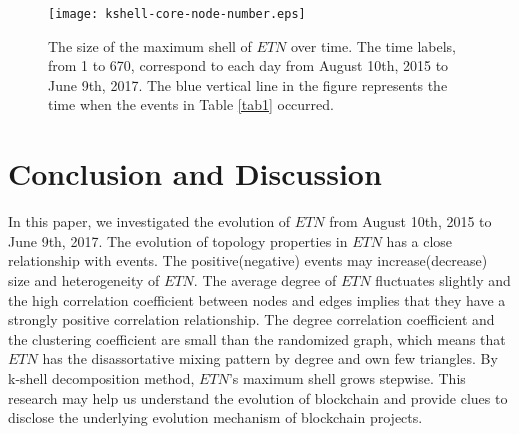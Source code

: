 \documentclass[conference]{IEEEtran}
\begin{document}
\begin{CJK*}{UTF8}{gbsn}
\begin{figure}[htbp]
\centering
\texttt{[image: kshell-core-node-number.eps]}
\caption{The size of the maximum shell of $ETN$ over time. The time labels, from 1 to 670, correspond to each day from August 10th, 2015 to June 9th, 2017. The blue vertical line in the figure represents the time when the events in Table \ref{tab1} occurred.}
\label{fig10}
\end{figure}

\section{Conclusion and Discussion}

In this paper, we investigated the evolution of $ETN$ from August 10th, 2015 to June 9th, 2017. The evolution of topology properties in $ETN$ has a close relationship with events. The positive(negative) events may increase(decrease) size and heterogeneity of $ETN$. The average degree of $ETN$ fluctuates slightly and the high correlation coefficient between nodes and edges implies that they have a strongly positive correlation relationship. The degree correlation coefficient and the clustering coefficient are small than the randomized graph, which means that $ETN$ has the disassortative mixing pattern by degree and own few triangles. By k-shell decomposition method, $ETN$'s maximum shell grows stepwise. This research may help us understand the evolution of blockchain and provide clues to disclose the underlying evolution mechanism of blockchain projects.





\end{CJK*}
\end{document}
